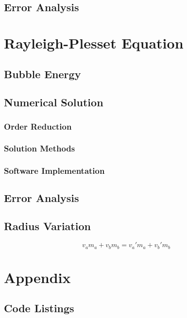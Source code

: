 \documentclass[12pt]{article}
\begin{document}
\subsection{Error Analysis}

\section{Rayleigh-Plesset Equation}
\subsection{Bubble Energy}
\subsection{Numerical Solution}
\subsubsection{Order Reduction}
\subsubsection{Solution Methods}
\subsubsection{Software Implementation}
\subsection{Error Analysis}
\subsection{Radius Variation}

\begin{equation}
    \label{eqn:pt1_momentum}
    v_a m_a + v_b m_b = v_a' m_a + v_b' m_b
\end{equation}

\pagebreak
\section{Appendix}

\subsection{Code Listings}

\end{document}
